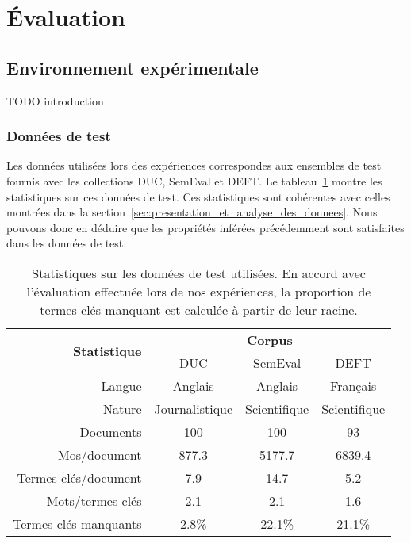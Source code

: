\section{Évaluation}
\label{sec:evaluation}
  \subsection{Environnement expérimentale}
  \label{subsec:environnement_experimentale}
    TODO introduction

    \subsubsection{Données de test}
    \label{subsubsec:donnees_de_test}
      Les données utilisées lors des expériences correspondes aux ensembles de
      test fournis avec les collections DUC, SemEval et DEFT. Le
      tableau~\ref{tab:donnees_de_test} montre les statistiques sur ces données
      de test. Ces statistiques sont cohérentes avec celles montrées dans la
      section~\ref{sec:presentation_et_analyse_des_donnees}. Nous pouvons donc
      en déduire que les propriétés inférées précédemment sont satisfaites dans
      les données de test.
      \begin{table}
        \centering
        \begin{tabular}{@{~~}rccc@{~~}}
          \toprule
          \multirow{2}{*}[-2pt]{\textbf{Statistique}} & \multicolumn{3}{c}{\textbf{Corpus}}\\
          \cmidrule{2-4}
          & DUC & SemEval & DEFT\\
          \midrule
          Langue & Anglais & Anglais & Français\\
          Nature & Journalistique & Scientifique & Scientifique\\
          Documents & 100 & 100 & 93\\
          Mos/document & 877.3 & 5177.7 & 6839.4\\
          Termes-clés/document & 7.9 & 14.7 & 5.2\\
          Mots/termes-clés & 2.1 & 2.1 & 1.6\\
          Termes-clés manquants & 2.8\% & 22.1\% & 21.1\% \\
          \bottomrule
        \end{tabular}
        \caption{Statistiques sur les données de test utilisées. En accord avec
                 l'évaluation effectuée lors de nos expériences, la proportion
                 de termes-clés manquant est calculée à partir de leur racine.
                 \label{tab:donnees_de_test}}
      \end{table}


